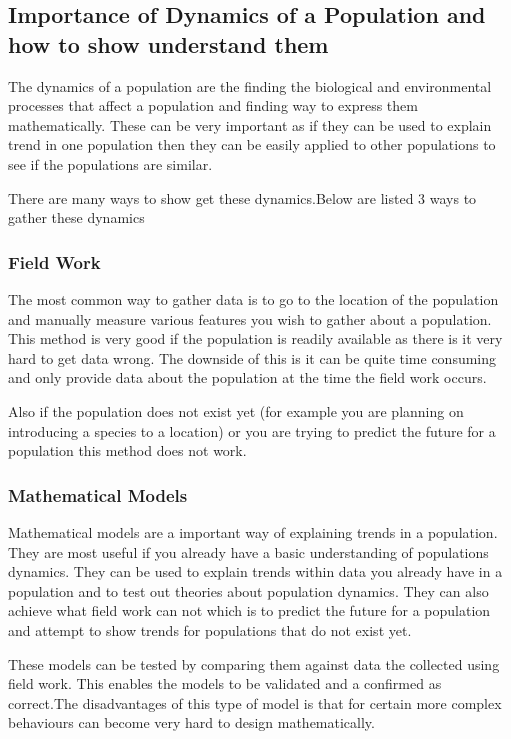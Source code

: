 \documentclass[final]{cmpreport}
\begin{document}
\subsection{Importance of Dynamics of a Population and how to show understand them}

The dynamics of a population are the finding the biological and environmental processes that affect a population and finding way to express them mathematically. These can be very important as if they can be used to explain trend in one population then they can be easily applied to other populations to see if the populations are similar. 

There are many ways to show get these dynamics.Below are listed 3 ways to gather these dynamics

\subsubsection{Field Work}
The most common way to gather data is to go to the location of the population and manually measure various features you wish to gather about a population. This method is very good if the population is readily available as there is it very hard to get data wrong. The downside of this is it can be quite time consuming and only provide data about the population at the time the field work occurs. 

Also if the population does not exist yet (for example you are planning on introducing a species to a location) or you are trying to predict the future for a population this method does not work. 

\subsubsection{Mathematical Models}

Mathematical models are a important way of explaining trends in a population. They are most useful if you already have a basic understanding of populations dynamics. They can be used to explain trends within data you already have in a population and to test out theories about population dynamics. They can also achieve what field work can not which is to predict the future for a population and attempt to show trends for populations that do not exist yet. 

These models can be tested by comparing them against data the collected using field work. This enables the models to be validated and a confirmed as correct.The disadvantages of this type of model is that for certain more complex behaviours can become very hard to design mathematically.
\end{document}
